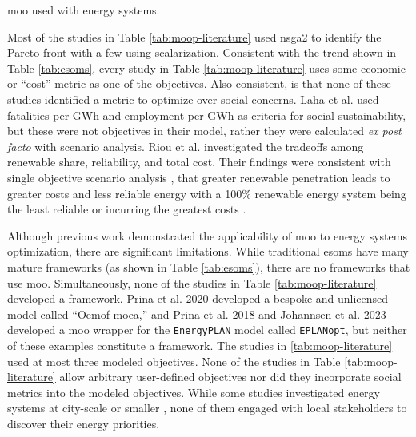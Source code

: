 \begin{table}[ht!]
    \centering
    \caption{\ac{moo} used with energy systems.}
    \label{tab:moop-literature}
    \resizebox*{\textwidth}{!}{}
\end{table}
Most of the studies in Table \ref{tab:moop-literature} used \ac{nsga2} to
identify the Pareto-front with a few using scalarization. Consistent with the
trend shown in Table \ref{tab:esoms}, every study in Table
\ref{tab:moop-literature} uses some economic or ``cost'' metric as one of the
objectives. Also consistent, is that none of these studies identified a metric
to optimize over social concerns. Laha et al. \cite{laha_low_2021} used
fatalities per GWh and employment per GWh as criteria for social sustainability,
but these were not objectives in their model, rather they were calculated
\textit{ex post facto} with scenario analysis. Riou et al.
\cite{riou_multi-objective_2021} investigated the tradeoffs among renewable
share, reliability, and total cost. Their findings were consistent with single
objective scenario analysis \cite{de_sisternes_value_2016}, that greater
renewable penetration leads to greater costs and less reliable energy with a
100\% renewable energy system being the least reliable or incurring the greatest
costs \cite{riou_multi-objective_2021}. 

Although previous work demonstrated the applicability of \ac{moo} to energy
systems optimization, there are significant limitations. While traditional
\acp{esom} have many mature frameworks (as shown in Table \ref{tab:esoms}),
there are no frameworks that use \ac{moo}. Simultaneously, none of the studies
in Table \ref{tab:moop-literature} developed a framework. Prina et al. 2020
\cite{prina_multi-objective_2020} developed a bespoke and unlicensed model
called ``Oemof-moea,'' and Prina et al. 2018 \cite{prina_multi-objective_2018}
and Johannsen et al. 2023 \cite{johannsen_municipal_2023} developed a \ac{moo}
wrapper for the \texttt{EnergyPLAN} model called \texttt{EPLANopt}, but neither of
these examples constitute a framework. The studies in \ref{tab:moop-literature}
used at most three modeled
objectives\cite{riou_multi-objective_2021,de-leon_almaraz_deployment_2015,
de-leon_almaraz_assessment_2013}. None of the studies in Table
\ref{tab:moop-literature} allow arbitrary user-defined objectives nor did they 
incorporate social metrics into the modeled objectives. While some
studies investigated energy systems at city-scale or smaller
\cite{riou_multi-objective_2021,
mayer_environmental_2020,fleischhacker_portfolio_2019,johannsen_municipal_2023},
none of them engaged with local stakeholders to discover their energy
priorities.

